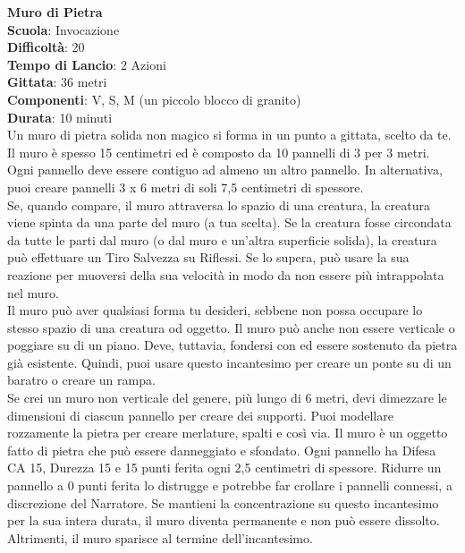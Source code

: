 \begin{multicols}{2}
\medskip\textbf{Muro di Pietra}\\
\textbf{Scuola}: Invocazione\\
\textbf{Difficoltà}: 20\\
\textbf{Tempo di Lancio}: 2 Azioni\\
\textbf{Gittata}: 36 metri\\
\textbf{Componenti}: V, S, M (un piccolo blocco di granito)\\
\textbf{Durata}: 10 minuti\\
Un muro di pietra solida non magico si forma in un punto a gittata, scelto da te. Il muro è spesso 15 centimetri ed è composto da 10 pannelli di 3 per 3 metri. Ogni pannello deve essere contiguo ad almeno un altro pannello. In alternativa, puoi creare pannelli 3 x 6 metri di soli 7,5 centimetri di spessore.\\
Se, quando compare, il muro attraversa lo spazio di una creatura, la creatura viene spinta da una parte del muro (a tua scelta). Se la creatura fosse circondata da tutte le parti dal muro (o dal muro e un'altra superficie solida), la creatura può effettuare un Tiro Salvezza su Riflessi. Se lo supera, può usare la sua reazione per muoversi della sua velocità in modo da non essere più intrappolata nel muro.\\
Il muro può aver qualsiasi forma tu desideri, sebbene non possa occupare lo stesso spazio di una creatura od oggetto. Il muro può anche non essere verticale o poggiare su di un piano. Deve, tuttavia, fondersi con ed essere sostenuto da pietra già esistente. Quindi, puoi usare questo incantesimo per creare un ponte su di un baratro o creare un rampa.\\
Se crei un muro non verticale del genere, più lungo di 6 metri, devi dimezzare le dimensioni di ciascun pannello per creare dei supporti. Puoi modellare rozzamente la pietra per creare merlature, spalti e così via. Il muro è un oggetto fatto di pietra che può essere danneggiato e sfondato. Ogni pannello ha Difesa CA 15, Durezza 15 e 15 punti ferita ogni 2,5 centimetri di spessore. Ridurre un pannello a 0 punti ferita lo distrugge e potrebbe far crollare i pannelli connessi, a discrezione del Narratore. Se mantieni la concentrazione su questo incantesimo per la sua intera durata, il muro diventa permanente e non può essere dissolto. Altrimenti, il muro sparisce al termine dell'incantesimo.


\end{multicols}
